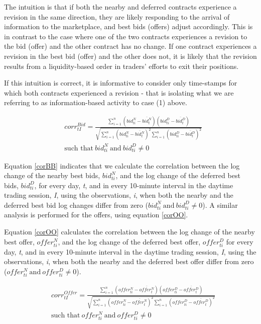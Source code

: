 \documentclass[review,12pt]{elsarticle}
\begin{document}
\begin{linenumbers}
The intuition is that if both the nearby and deferred contracts
experience a revision in the same direction, they are likely responding
to the arrival of information to the marketplace, and best bids (offers)
adjust accordingly. This is in contrast to the case where one of the two
contracts experiences a revision to the bid (offer) and the other
contract has no change. If one contract experiences a revision in the
best bid (offer) and the other does not, it is likely that the revision
results from a liquidity-based order in traders' efforts to exit their
positions.

If this intuition is correct, it is informative to consider only
time-stamps for which both contracts experienced a revision - that is
isolating what we are referring to as information-based activity to case
(1) above.

\begin{equation} \label{corBB} 
\begin{split}
& corr^{Bid}_{tI} = \frac{\sum\limits_{i=1}^{n} \left(bid_{ti}^N - \overline{bid_t^N}\right) \left(bid_{ti}^D - \overline{bid_t^D}\right)}{\sqrt{\sum\limits_{i=1}^{n} \left(bid_{ti}^N - \overline{bid_t^N}\right)^2 \sum\limits_{i=1}^{n}\left(bid_{ti}^D - \overline{bid_t^D}\right)^2}} \\ 
& \textrm{such that} \: bid_{ti}^N \: \textrm{and} \: bid_{ti}^D \neq 0
\end{split}
\end{equation}

Equation \ref{corBB} indicates that we calculate the correlation between
the log change of the nearby best bids, \(bid_{ti}^N\), and the log
change of the deferred best bids, \(bid_{ti}^D\), for every day,
\emph{t}, and in every 10-minute interval in the daytime trading
session, \emph{I}, using the observations, \emph{i}, when both the
nearby and the deferred best bid log changes differ from zero
(\(bid_{ti}^N \: \textrm{and} \: bid_{ti}^D \neq 0\)). A similar
analysis is performed for the offers, using equation \ref{corOO}.

Equation \ref{corOO} calculates the correlation between the log change
of the nearby best offer, \(offer_{ti}^N\), and the log change of the
deferred best offer, \(offer_{ti}^D\) for every day, \emph{t}, and in
every 10-minute interval in the daytime trading session, \emph{I}, using
the observations, \emph{i}, when both the nearby and the deferred best
offer differ from zero
(\({offer_{ti}^N \: \textrm{and} \: offer_{ti}^D} \neq 0\)).

\begin{equation} \label{corOO}
\begin{split}
& corr^{Offer}_{tI} = \frac{\sum\limits_{i=1}^{n} \left(offer_{ti}^N - \overline{offer_t^N}\right) \left(offer_{ti}^D - \overline{offer_t^D}\right)}{\sqrt{\sum\limits_{i=1}^{n} \left(offer_{ti}^N - \overline{offer_t^N}\right)^2 \sum\limits_{i=1}^{n}\left(offer_{ti}^D - \overline{offer_t^D}\right)^2}} \\
& \textrm{such that} \: {offer_{ti}^N \: \textrm{and} \: offer_{ti}^D} \neq 0 
\end{split}
\end{equation}


\end{linenumbers}
\end{document}
